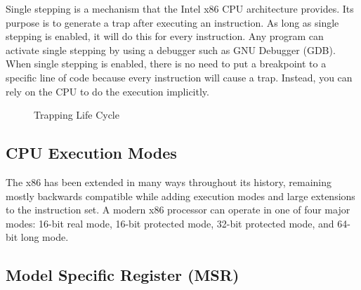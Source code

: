 \documentclass{report}
\begin{document}
\begin{spacing}{1.5}
Single stepping is a mechanism that the Intel x86 CPU architecture provides. Its purpose is to generate a trap after executing an instruction. As long as single stepping is enabled, it will do this for every instruction. Any program can activate single stepping by using a debugger such as GNU Debugger (GDB). When single stepping is enabled, there is no need to put a breakpoint to a specific line of code because every instruction will cause a trap. Instead, you can rely on the CPU to do the execution implicitly.


\begin{figure}[ht]
  \caption{Trapping Life Cycle}
\end{figure}


\subsection{CPU Execution Modes}

{\large
The x86 has been extended in many ways throughout its history, remaining mostly backwards compatible while adding execution modes and large extensions to the instruction set. A modern x86 processor can operate in one of four major modes: 16-bit real mode, 16-bit protected mode, 32-bit protected mode, and 64-bit long mode.
\newline
}



\subsection{Model Specific Register (MSR)}


\end{spacing}
\end{document}
